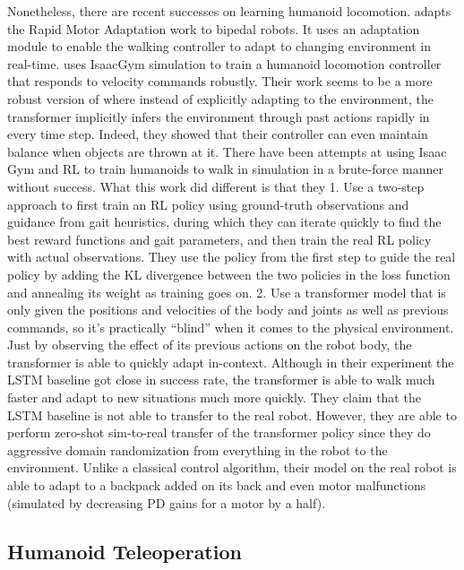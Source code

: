 Nonetheless, there are recent successes on learning humanoid locomotion.
\cite{kumar2022adapting} adapts the Rapid Motor Adaptation work \cite{kumar2021rma} to bipedal robots. It uses an adaptation module to enable the walking controller to adapt to changing environment in real-time. \cite{radosavovic2023learning} uses IsaacGym simulation to train a humanoid locomotion controller that responds to velocity commands robustly. Their work seems to be a more robust version of \cite{kumar2022adapting} where instead of explicitly adapting to the environment, the transformer implicitly infers the environment through past actions rapidly in every time step. Indeed, they showed that their controller can even maintain balance when objects are thrown at it. There have been attempts at using Isaac Gym and RL to train humanoids to walk in simulation in a brute-force manner without success. What this work did different is that they
1. Use a two-step approach to first train an RL policy using ground-truth observations and guidance from gait heuristics, during which they can iterate quickly to find the best reward functions and gait parameters, and then train the real RL policy with actual observations. They use the policy from the first step to guide the real policy by adding the KL divergence between the two policies in the loss function and annealing its weight as training goes on.
2. Use a transformer model that is only given the positions and velocities of the body and joints as well as previous commands, so it’s practically “blind” when it comes to the physical environment. Just by observing the effect of its previous actions on the robot body, the transformer is able to quickly adapt in-context. Although in their experiment the LSTM baseline got close in success rate, the transformer is able to walk much faster and adapt to new situations much more quickly. They claim that the LSTM baseline is not able to transfer to the real robot.
However, they are able to perform zero-shot sim-to-real transfer of the transformer policy since they do aggressive domain randomization from everything in the robot to the environment. Unlike a classical control algorithm, their model on the real robot is able to adapt to a backpack added on its back and even motor malfunctions (simulated by decreasing PD gains for a motor by a half).

\subsection{Humanoid Teleoperation}


